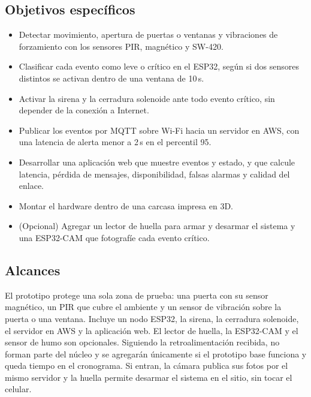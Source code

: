\documentclass[conference]{IEEEtran}
\begin{document}
\subsection{Objetivos específicos}
\begin{itemize}
  \item Detectar movimiento, apertura de puertas o ventanas y vibraciones de forzamiento con los sensores PIR, magnético y SW-420.
  \item Clasificar cada evento como leve o crítico en el ESP32, según si dos sensores distintos se activan dentro de una ventana de 10\,s.
  \item Activar la sirena y la cerradura solenoide ante todo evento crítico, sin depender de la conexión a Internet.
  \item Publicar los eventos por MQTT sobre Wi-Fi hacia un servidor en AWS, con una latencia de alerta menor a 2\,s en el percentil 95.
  \item Desarrollar una aplicación web que muestre eventos y estado, y que calcule latencia, pérdida de mensajes, disponibilidad, falsas alarmas y calidad del enlace.
  \item Montar el hardware dentro de una carcasa impresa en 3D.
  \item (Opcional) Agregar un lector de huella para armar y desarmar el sistema y una ESP32-CAM que fotografíe cada evento crítico.
\end{itemize}

\subsection{Alcances}
\label{sec:alcance}
El prototipo protege una sola zona de prueba: una puerta con su sensor magnético, un PIR que cubre el ambiente y un sensor de vibración sobre la puerta o una ventana. Incluye un nodo ESP32, la sirena, la cerradura solenoide, el servidor en AWS y la aplicación web. El lector de huella, la ESP32-CAM y el sensor de humo son opcionales. Siguiendo la retroalimentación recibida, no forman parte del núcleo y se agregarán únicamente si el prototipo base funciona y queda tiempo en el cronograma. Si entran, la cámara publica sus fotos por el mismo servidor y la huella permite desarmar el sistema en el sitio, sin tocar el celular.
\end{document}
